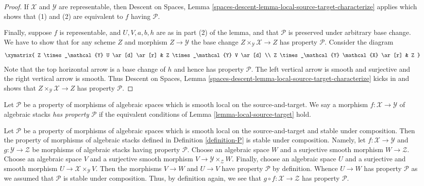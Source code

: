 \begin{proof}
\medskip\noindent
If $\mathcal{X}$ and $\mathcal{Y}$ are representable, then
Descent on Spaces,
Lemma \ref{spaces-descent-lemma-local-source-target-characterize}
applies which shows that (1) and (2) are equivalent to $f$ having
$\mathcal{P}$.

\medskip\noindent
Finally, suppose $f$ is representable, and $U, V, a, b, h$ are
as in part (2) of the lemma, and that $\mathcal{P}$ is preserved under
arbitrary base change. We have to show that for any scheme
$Z$ and morphism $Z \to \mathcal{Y}$ the base change
$Z \times_\mathcal{Y} \mathcal{X} \to Z$
has property $\mathcal{P}$. Consider the diagram
$$
\xymatrix{
Z \times_\mathcal{Y} U \ar[d] \ar[r] &
Z \times_\mathcal{Y} V \ar[d] \\
Z \times_\mathcal{Y} \mathcal{X} \ar[r] &
Z
}
$$
Note that the top horizontal arrow is a base change of $h$ and
hence has property $\mathcal{P}$. The left vertical arrow is smooth
and surjective and the right vertical arrow is smooth. Thus
Descent on Spaces,
Lemma \ref{spaces-descent-lemma-local-source-target-characterize}
kicks in and shows that $Z \times_\mathcal{Y} \mathcal{X} \to Z$
has property $\mathcal{P}$.
\end{proof}

\begin{definition}
\label{definition-P}
Let $\mathcal{P}$ be a property of morphisms of algebraic spaces
which is smooth local on the source-and-target.
We say a morphism $f : \mathcal{X} \to \mathcal{Y}$ of algebraic stacks
{\it has property $\mathcal{P}$} if the equivalent conditions of
Lemma \ref{lemma-local-source-target}
hold.
\end{definition}

\begin{remark}
\label{remark-composition}
Let $\mathcal{P}$ be a property of morphisms of algebraic spaces
which is smooth local on the source-and-target and stable under composition.
Then the property of morphisms of algebraic stacks defined in
Definition \ref{definition-P}
is stable under composition. Namely, let $f : \mathcal{X} \to \mathcal{Y}$
and $g : \mathcal{Y} \to \mathcal{Z}$ be morphisms of algebraic stacks
having property $\mathcal{P}$. Choose an algebraic space $W$ and a
surjective smooth morphism $W \to \mathcal{Z}$. Choose an algebraic space
$V$ and a surjective smooth morphism $V \to \mathcal{Y} \times_\mathcal{Z} W$.
Finally, choose an algebraic space $U$ and a surjective and smooth morphism
$U \to \mathcal{X} \times_\mathcal{Y} V$. Then the morphisms
$V \to W$ and $U \to V$ have property $\mathcal{P}$ by definition.
Whence $U \to W$ has property $\mathcal{P}$ as we assumed that
$\mathcal{P}$ is stable under composition. Thus, by definition again,
we see that $g \circ f : \mathcal{X} \to \mathcal{Z}$ has
property $\mathcal{P}$.
\end{remark}

